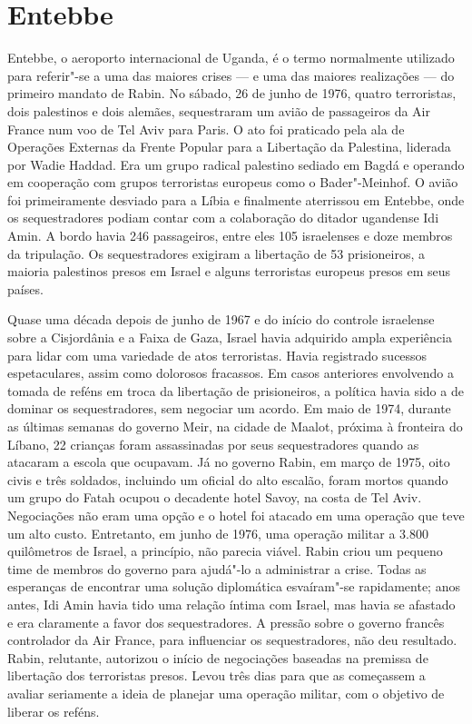 \section{Entebbe}

Entebbe, o aeroporto internacional de Uganda, é o termo normalmente
utilizado para referir"-se a uma das maiores crises --- e uma das maiores
realizações --- do primeiro mandato de Rabin. No sábado, 26 de junho de
1976, quatro terroristas, dois palestinos e dois alemães, sequestraram
um avião de passageiros da Air France num voo de Tel Aviv para Paris. O
ato foi praticado pela ala de Operações Externas da Frente Popular para a Libertação da Palestina, liderada por Wadie Haddad. Era um grupo radical
palestino sediado em Bagdá e operando em cooperação com grupos
terroristas europeus como o Bader"-Meinhof. O avião foi primeiramente
desviado para a Líbia e finalmente aterrissou em Entebbe, onde os
sequestradores podiam contar com a colaboração do ditador ugandense Idi
Amin. A bordo havia 246 passageiros, entre eles 105 israelenses e doze
membros da tripulação. Os sequestradores exigiram a libertação de 53
prisioneiros, a maioria palestinos presos em Israel e alguns terroristas
europeus presos em seus países.

Quase uma década depois de junho de 1967 e do início do controle
israelense sobre a Cisjordânia e a Faixa de Gaza, Israel havia adquirido
ampla experiência para lidar com uma variedade de atos terroristas.
Havia registrado sucessos espetaculares, assim como dolorosos fracassos.
Em casos anteriores envolvendo a tomada de reféns em troca da libertação
de prisioneiros, a política havia sido a de dominar os sequestradores,
sem negociar um acordo. Em maio de 1974, durante as últimas semanas do
governo Meir, na cidade de Maalot, próxima à fronteira do Líbano,
22 crianças foram assassinadas por seus sequestradores quando
as  atacaram a escola que ocupavam. Já no governo Rabin, em março de
1975, oito civis e três soldados, incluindo um oficial do alto escalão,
foram mortos quando um grupo do Fatah ocupou o decadente hotel Savoy, na
costa de Tel Aviv. Negociações não eram uma opção e o hotel foi atacado
em uma operação que teve um alto custo. Entretanto, em junho de 1976, uma
operação militar a 3.800 quilômetros de Israel, a princípio, não parecia
viável. Rabin criou um pequeno time de membros do governo para ajudá"-lo
a administrar a crise. Todas as esperanças de encontrar uma solução
diplomática esvaíram"-se rapidamente; anos antes, Idi Amin havia tido uma
relação íntima com Israel, mas havia se afastado e era claramente a
favor dos sequestradores. A pressão sobre o governo francês controlador
da Air France, para influenciar os sequestradores, não deu resultado.
Rabin, relutante, autorizou o início de negociações baseadas na premissa
de libertação dos terroristas presos. Levou três dias para que as 
começassem a avaliar seriamente a ideia de planejar uma operação
militar, com o objetivo de liberar os reféns.

